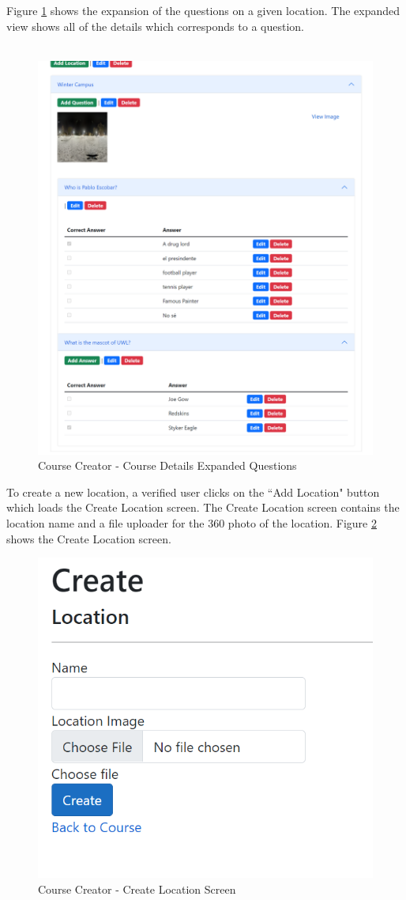 \clearpage
 Figure \ref{CC Expanded} shows the expansion of the questions on a given location. The expanded view shows all of the details which corresponds to a question. \\
\\
\begin{figure}[htb]
	\centering
	\includegraphics[width=.6\textwidth]{Requirements/assets/cc-questions-expanded.png}
	\caption[Course Creator - Course Details Expanded Questions]{\label{CC Expanded}Course Creator - Course Details Expanded Questions}
\end{figure}
\clearpage
To create a new location, a verified user clicks on the ``Add Location" button which loads the Create Location screen. The Create Location screen contains the location name and a file uploader for the 360 photo of the location. Figure \ref{CC Create Location} shows the Create Location screen.
\begin{figure}[htb]
	\centering
	\includegraphics[width=.6\textwidth]{Requirements/assets/cc-create-location.png}
	\caption[Course Creator - Create Location Screen]{\label{CC Create Location}Course Creator - Create Location Screen}
\end{figure}

